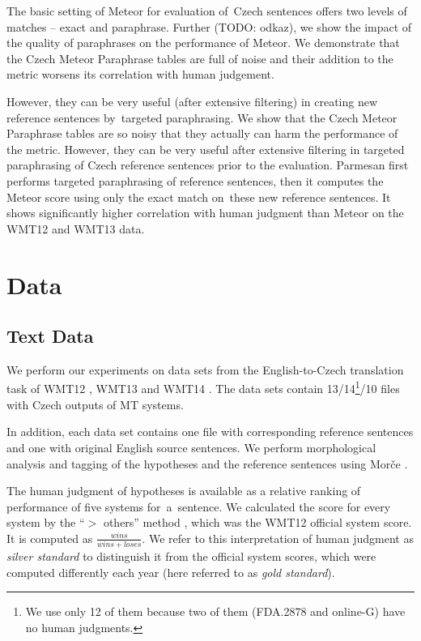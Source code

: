 \documentclass[11pt]{article}
\begin{document}
The basic setting of Meteor for evaluation of~Czech sentences offers two levels of matches -- 
exact and paraphrase. Further (TODO: odkaz), we show the impact of the quality of paraphrases 
on the performance of Meteor. We demonstrate that the Czech Meteor Paraphrase tables are full 
of noise and their addition to the metric worsens its correlation with human judgement. 

However, they can be very useful (after extensive filtering) in creating new reference sentences 
by~targeted paraphrasing. 
We show that the Czech Meteor Paraphrase tables are so noisy that they actually can harm 
the performance of the metric. However, they can be very useful after extensive filtering 
in targeted paraphrasing of Czech reference sentences prior to the evaluation.
Parmesan first performs targeted paraphrasing of reference sentences, then it computes 
the Meteor score using only the exact match on~these new reference sentences. It shows 
significantly higher correlation with human judgment than Meteor on the WMT12 and WMT13 data. 

\section{Data}
\subsection{Text Data}
We perform our experiments on data sets from the English-to-Czech translation 
task of WMT12 \cite{wmt12}, WMT13 \cite{wmt13} and WMT14 \cite{wmt14}. The data 
sets contain 13/14\footnote{We use only 12 of them because two of them (FDA.2878 
and online-G) have no human judgments.}/10 files with Czech outputs of MT systems.

In addition, each data set contains one file with corresponding reference sentences 
and one with original English source sentences. We perform morphological analysis 
and tagging of the hypotheses and the reference sentences using Morče \cite{morce:2007}.

The human judgment of hypotheses is available as a relative ranking of performance of 
five systems for~a~sentence. We calculated the score for every system by the “$ > $ others” 
method \cite{bojar-grains}, which was the WMT12 official system score. It is computed 
as $ \frac{wins}{wins+loses} $. We refer to this interpretation of human judgment as 
\textit{silver standard} to distinguish it from the official system scores, which were 
computed differently each year (here referred to as \textit{gold standard}).
\end{document}
